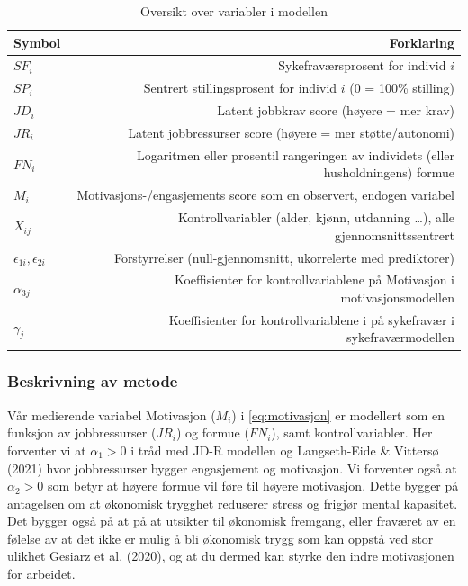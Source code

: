 \documentclass[
  12pt,
  a4paper,
  DIV=11,
  numbers=noendperiod]{scrartcl}
\begin{document}
\begin{table}[H]
\centering
\begin{tabular}{lr}
\toprule
Symbol & Forklaring \\ 
\midrule
$SF_i$ & Sykefraværsprosent for individ $i$ \\
$SP_i$ & Sentrert stillingsprosent for individ $i$ (0 = 100\% stilling) \\
$JD_i$ & Latent jobbkrav score (høyere = mer krav) \\
$JR_i$ & Latent jobbressurser score (høyere = mer støtte/autonomi) \\
$FN_i$ & Logaritmen eller prosentil rangeringen av individets (eller husholdningens) formue \\
$M_i$ & Motivasjons-/engasjements score som en observert, endogen variabel \\
$X_{ij}$ & Kontrollvariabler (alder, kjønn, utdanning …), alle gjennomsnittssentrert \\
$\epsilon_{1i}, \epsilon_{2i}$ & Forstyrrelser (null-gjennomsnitt, ukorrelerte med prediktorer) \\  
$\alpha_{3j} $ & Koeffisienter for kontrollvariablene på Motivasjon i motivasjonsmodellen \\
$\gamma_{j} $ & Koeffisienter for kontrollvariablene i på sykefravær i sykefraværmodellen \\
\hline
\end{tabular}
\caption{Oversikt over variabler i modellen}
\label{tab:variabler}
\end{table}

\subsubsection{Beskrivning av metode}\label{beskrivning-av-metode}

Vår medierende variabel Motivasjon (\(M_i\)) i \autoref{eq:motivasjon}
er modellert som en funksjon av jobbressurser (\(JR_i\)) og formue
(\(FN_i\)), samt kontrollvariabler. Her forventer vi at \(\alpha_1 > 0\)
i tråd med JD-R modellen og Langseth-Eide \& Vittersø (2021) hvor
jobbressurser bygger engasjement og motivasjon. Vi forventer også at
\(\alpha_2 > 0\) som betyr at høyere formue vil føre til høyere
motivasjon. Dette bygger på antagelsen om at økonomisk trygghet
reduserer stress og frigjør mental kapasitet. Det bygger også på at på
at utsikter til økonomisk fremgang, eller fraværet av en følelse av at
det ikke er mulig å bli økonomisk trygg som kan oppstå ved stor ulikhet
Gesiarz et al. (2020), og at du dermed kan styrke den indre motivasjonen
for arbeidet.
\end{document}
